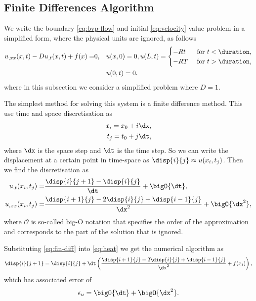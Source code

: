 \documentclass[twoside,a4paper,12pt]{article}
\begin{document}
\subsection{Finite Differences Algorithm}

We write the boundary \eqref{eq:bvp-flow} and initial
\eqref{eq:velocity} value problem in a simplified form, where the
physical units are ignored, as follows
%
\begin{align}
  \label{eq:heat}
  u_{,xx}(x,t) - D u_{,t}(x,t) + f(x) 
  =& 0 ,        &&u(x,0) = 0, u(L,t) =
            \begin{cases}
              -Rt &\text{ for } t < \duration,\\
              -RT &\text{ for } t > \duration,
            \end{cases}\\\nonumber
 &&& u(0,t) = 0.
\end{align}
%
where in this subsection we consider a simplified problem where $D=1$.

The simplest method for solving this system is a finite difference
method. This use time and space discretisation as
%
\begin{subequations}
  \begin{align}
    x_i = x_0 + i\dx,\\
    t_j = t_0 + j\dt,
  \end{align} \label{eq:discr}
\end{subequations}
%
where $\dx$ is the space step and $\dt$ is the time step.  So we can
write the displacement at a certain point in time-space as
$\disp{i}{j} \approx u(x_i,t_j)$. Then we find the discretisation as
%
\begin{subequations}
  \begin{align}
    u_{,t}(x_i,t_j)  =& \frac{\disp{i}{j+1} - \disp{i}{j}}{\dt} + \bigO{\dt}, \\
    u_{,xx}(x_i,t_j) =& \frac{\disp{i+1}{j} - 2\disp{i}{j} + \disp{i-1}{j}}{\dx^2} + \bigO{\dx^2},
  \end{align}\label{eq:fin-diff}
\end{subequations}
%
where $\mathcal{O}$ is so-called big-O notation that specifies the
order of the approximation and corresponds to the part of the solution
that is ignored.

Substituting \eqref{eq:fin-diff} into \eqref{eq:heat} we get the
numerical algorithm as
%
\begin{align}
\disp{i}{j+1}  =   \disp{i}{j} + \dt\left(\frac{\disp{i+1}{j} - 2\disp{i}{j} + \disp{i-1}{j}}{\dx^2}   + f(x_i) \right), \label{eq:findiff-alg}
\end{align}
%
which has associated error of
\begin{align}
  \epsilon_u =\bigO{\dt} + \bigO{\dx^2}.
\end{align}
\end{document}
